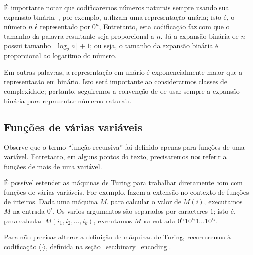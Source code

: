 
É importante notar que codificaremos números naturais
sempre usando sua expansão binária.
,
por exemplo,
utilizam uma representação unária;
isto é, o número $n$ é representado por $0^n$,
Entretanto,
esta codificação faz com que o tamanho da palavra resultante
seja proporcional a $n$.
Já a expansão binária de $n$ possui tamanho $\lfloor \log_2 n \rfloor + 1$;
ou seja, o tamanho da expansão binária é proporcional ao logaritmo do número.

Em outras palavras,
a representação em unário é exponencialmente maior que a representação em binário.
Isto será importante ao considerarmos classes de complexidade;
portanto,
seguiremos a convenção de 
de usar sempre a expansão binária para representar números naturais.

\subsection{Funções de várias variáveis}

Observe que o termo ``função recursiva''
foi definido apenas para funções de uma variável.
Entretanto,
em alguns pontos do texto,
precisaremos nos referir a funções de mais de uma variável.

É possível estender as máquinas de Turing
para trabalhar diretamente com com funções de várias variáveis.
Por exemplo, 
fazem a extensão no contexto de funções de inteiros.
Dada uma máquina $M$,
para calcular o valor de $M(i)$,
executamos $M$ na entrada $0^i$.
Os vários argumentos são separados por caracteres $1$;
isto é, para calcular $M(i_1, i_2, \dots, i_k)$,
executamos $M$ na entrada $0^{i_1} 1 0^{i_2} 1 \dots 1 0^{i_k}$.

Para não precisar alterar a definição de máquinas de Turing,
recorreremos à codificação $\langle \cdot \rangle$,
definida na seção~\ref{sec:binary_encoding}.

